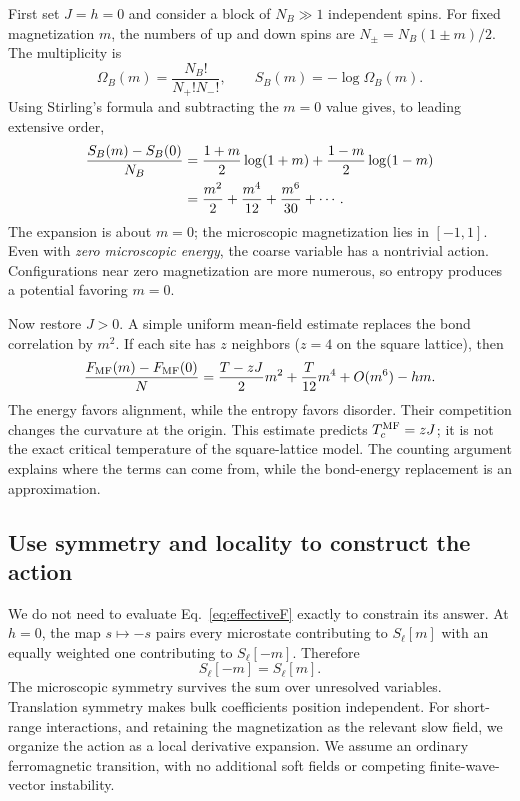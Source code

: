 \documentclass[11pt]{article}
\begin{document}
First set \(J=h=0\) and consider a block of \(N_B\gg1\) independent spins.
For fixed magnetization \(m\), the numbers of up and down spins are
\(N_\pm=N_B(1\pm m)/2\). The multiplicity is
\begin{equation}
\Omega_B(m)=\frac{N_B!}{N_+!N_-!},\qquad
S_B(m)=-\log\Omega_B(m).
\end{equation}
Using Stirling's formula and subtracting the \(m=0\) value gives, to
leading extensive order,
\begin{align}
\frac{S_B(m)-S_B(0)}{N_B}
&=\frac{1+m}{2}\log(1+m)
 +\frac{1-m}{2}\log(1-m)\notag\\
&=\frac{m^2}{2}+\frac{m^4}{12}+\frac{m^6}{30}+\cdots.
\label{eq:entropyPotential}
\end{align}
The expansion is about \(m=0\); the microscopic magnetization lies in
\([-1,1]\). Even with \emph{zero microscopic energy}, the coarse variable
has a nontrivial action. Configurations near zero magnetization are more
numerous, so entropy produces a potential favoring \(m=0\).

Now restore \(J>0\). A simple uniform mean-field estimate replaces the
bond correlation by \(m^2\). If each site has \(z\) neighbors
(\(z=4\) on the square lattice), then
\begin{equation}
\frac{F_{\rm MF}(m)-F_{\rm MF}(0)}{N}
=\frac{T-zJ}{2}m^2+\frac{T}{12}m^4+O(m^6)-hm.
\label{eq:MFpotential}
\end{equation}
The energy favors alignment, while the entropy favors disorder. Their
competition changes the curvature at the origin. This estimate predicts
\(T_c^{\rm MF}=zJ\); it is not the exact critical temperature of the
square-lattice model. The counting argument explains where the terms can
come from, while the bond-energy replacement is an approximation.

\subsection{Use symmetry and locality to construct the action}

We do not need to evaluate Eq.~\eqref{eq:effectiveF} exactly to constrain
its answer. At \(h=0\), the map \(s\mapsto-s\) pairs every microstate
contributing to \(S_\ell[m]\) with an equally weighted one contributing to
\(S_\ell[-m]\). Therefore
\begin{equation}
S_\ell[-m]=S_\ell[m].
\label{eq:blockedSymmetry}
\end{equation}
The microscopic symmetry survives the sum over unresolved variables.
Translation symmetry makes bulk coefficients position independent.
For short-range interactions, and retaining the magnetization as the
relevant slow field, we organize the action as a local derivative expansion.
We assume an ordinary ferromagnetic transition, with no additional soft
fields or competing finite-wave-vector instability.
\end{document}
